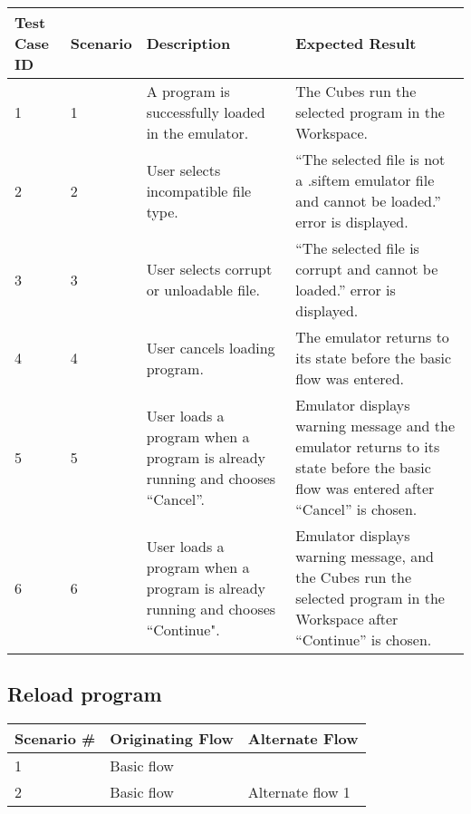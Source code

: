 \documentclass[12pt]{article}
\begin{document}
\begin{table}[h!]
  \begin{tabular}{p{.5in} | p{.75in} | p{2.15in} | p{2.15in}}
    \textbf{Test Case ID} &
    \textbf{Scenario} &
    \textbf{Description} &
    \textbf{Expected Result} \\ \hline

    1 &
    1 &
    A program is successfully loaded in the emulator. &
    The Cubes run the selected program in the Workspace. \\ \hline

    2 &
    2 &
    User selects incompatible file type. &
    ``The selected file is not a .siftem emulator file and cannot be loaded.'' error is displayed. \\ \hline

    3 &
    3 &
    User selects corrupt or unloadable file. &
    ``The selected file is corrupt and cannot be loaded.'' error is displayed. \\ \hline

    4 &
    4 &
    User cancels loading program. &
    The emulator returns to its state before the basic flow was entered. \\ \hline

    5 &
    5 &
    User loads a program when a program is already running and chooses ``Cancel''. &
    Emulator displays warning message and the emulator returns to its state before the basic flow was entered after ``Cancel'' is chosen. \\ \hline

    6 &
    6 &
    User loads a program when a program is already running and chooses ``Continue". &
    Emulator displays warning message, and the Cubes run the selected program in the Workspace after ``Continue'' is chosen. \\ \hline
  \end{tabular}
\end{table}

\subsection{Reload program}

\begin{table}[h!]
  \begin{tabular}{l | l | l}
    \textbf{Scenario \#} &
    \textbf{Originating Flow} &
    \textbf{Alternate Flow} \\ \hline

    1 &
    Basic flow &
    \\ \hline

    2 &
    Basic flow &
    Alternate flow 1 \\ \hline

  \end{tabular}
\end{table}
\end{document}
